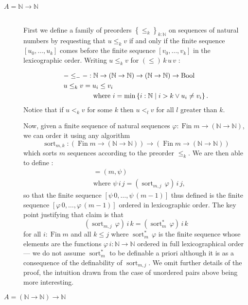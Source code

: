 \documentclass[envcountsame]{llncs}
\newcommand{\N}{\mathbb{N}}
\providecommand{\class}[1]{[#1]}
\providecommand{\set}  [1]{\left\{#1\right\}}
\DeclareMathOperator{\Bool}{Bool}
\DeclareMathOperator{\Fin}{Fin}
\DeclareMathOperator{\sort}{sort}
\begin{document}
\begin{description}
\item[$A=\N\to\N$] \hfill\\
First we define a family of preorders $\set{{\leq_k}}_{k:\N}$
on sequences of natural numbers by requesting that $u\leq_k v$
if and only if  the finite sequence $[u_0,\dots, u_k]$ comes before the finite sequence $[v_0,\dots, v_k]$ in the lexicographic order. Writing $u \leq_k v $ for $(\leq) \,k\,u\,v$ :


\begin{align*}
&{{-}\leq_{-}{-}} : \N\to (\N\to\N) \to (\N\to\N)\to \Bool\\
&{u\leq_k v} =  u_i\leq v_i \\
&\text{\phantom{$f\leq_n g =$} where }i =\min\set{i:\N\mid i>k\lor u_i\neq v_i}.
\end{align*}
Notice that if $u<_k v$ for some $k$ then $u<_l v$ for all $l$ greater than $k$.

Now, given a finite sequence of natural sequences $\varphi:\Fin m\to (\N\to\N)$, we can order it using any algorithm
\[\sort_{m,k} :(\Fin m \to (\N\to\N)) \to (\Fin m \to (\N\to\N))\]
which sorts $m$ sequences according to the preorder $\leq_k$.
We are then able to define :\begin{align*}
\class{(m,\varphi)} &= (m,\psi)\\
&\text{where $\psi\,i\,j = (\sort_{m,j}\,\varphi)\,i\,j$,}
\end{align*}
so that the finite sequence  $[\psi\,0,\dots,\psi\,(m-1)]$ thus defined is the finite sequence $[\varphi\,0,\dots,\varphi\,(m-1)]$ ordered in lexicographic order. The key point justifying that claim is that
\begin{equation}\label{eq:ms:order}
(\sort_{m, j}\,\varphi)\,i\,k=(\sort^\ast_{m}\,\varphi)\,i\,k
\end{equation}
for all $i:\Fin m$ and all $k\leq j$ where $\sort^\ast_m\,\varphi$ is the finite sequence whose elements are the functions $\varphi\,i:\N\to\N$ ordered in full lexicographical order --- we do not assume $\sort^\ast_m$ to be definable a priori although it is as a consequence of the definability of $\sort_{m,j}$.
We omit further details of the proof,  the intuition drawn from the case of unordered pairs above being more interesting.


\bigskip
\item[$A=(\N\to\N)\to\N$] \hfill\\



\end{description}
\end{document}
